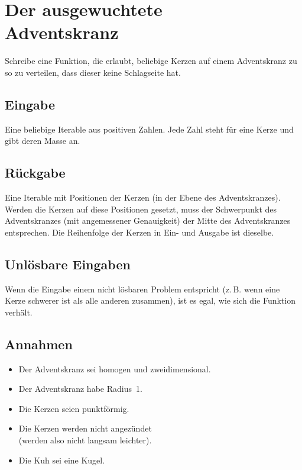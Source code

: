 \documentclass[a4paper, 14 pt]{extarticle}
\begin{document}
\section{Der ausgewuchtete\\ Adventskranz}

Schreibe eine Funktion, die erlaubt, beliebige Kerzen auf einem Adventskranz zu so zu verteilen, dass dieser keine Schlagseite hat.

\subsection{Eingabe}

Eine beliebige Iterable aus positiven Zahlen.
Jede Zahl steht für eine Kerze und gibt deren Masse an.

\subsection{Rückgabe}

Eine Iterable mit Positionen der Kerzen (in der Ebene des Adventskranzes).
Werden die Kerzen auf diese Positionen gesetzt, muss der Schwerpunkt des Adventskranzes (mit angemessener Genauigkeit) der Mitte des Adventskranzes entsprechen.
Die Reihenfolge der Kerzen in Ein- und Ausgabe ist dieselbe.

\subsection{Unlösbare Eingaben}
Wenn die Eingabe einem nicht lösbaren Problem entspricht (z.\,B. wenn eine Kerze schwerer ist als alle anderen zusammen), ist es egal, wie sich die Funktion verhält.

\subsection{Annahmen}
\begin{itemize}
	\item Der Adventskranz sei homogen und zweidimensional.
	\item Der Adventskranz habe Radius~1.
	\item Die Kerzen seien punktförmig.
	\item Die Kerzen werden nicht angezündet\\ (werden also nicht langsam leichter).
	\item Die Kuh sei eine Kugel.
\end{itemize}
\end{document}
